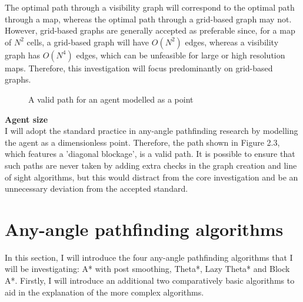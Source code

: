 \documentclass[12pt,twoside,notitlepage]{report}
\begin{document}
\noindent
The optimal path through a visibility graph will correspond to the optimal path through a map, whereas the optimal path through a grid-based graph may not. However, grid-based graphs are generally accepted as preferable since, for a map of {$N^{2}$} cells, a grid-based graph will have {$O(N^{2})$} edges, whereas a visibility graph has {$O(N^{4})$} edges, which can be unfeasible for large or high resolution maps. Therefore, this investigation will focus predominantly on grid-based graphs.\\

\begin{figure}
    \centering
  \caption{A valid path for an agent modelled as a point}
\end{figure}


\noindent
{\bfseries Agent size}\\

\noindent
I will adopt the standard practice in any-angle pathfinding research by modelling the agent as a dimensionless point. Therefore, the path shown in Figure 2.3, which features a 'diagonal blockage', is a valid path. It is possible to ensure that such paths are never taken by adding extra checks in the graph creation and line of sight algorithms, but this would distract from the core investigation and be an unnecessary deviation from the accepted standard.

\section{Any-angle pathfinding algorithms}

In this section, I will introduce the four any-angle pathfinding algorithms that I will be investigating: A* with post smoothing, Theta*, Lazy Theta* and Block A*. Firstly, I will introduce an additional two comparatively basic algorithms to aid in the explanation of the more complex algorithms.
\end{document}

